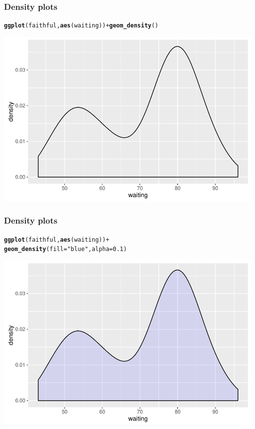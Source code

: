 \documentclass{beamer}\usepackage[]{graphicx}\usepackage[]{color}
\makeatletter
\newcommand{\hlnum}[1]{\textcolor[rgb]{0.686,0.059,0.569}{#1}}%
\newcommand{\hlstr}[1]{\textcolor[rgb]{0.192,0.494,0.8}{#1}}%
\newcommand{\hlopt}[1]{\textcolor[rgb]{0,0,0}{#1}}%
\newcommand{\hlstd}[1]{\textcolor[rgb]{0.345,0.345,0.345}{#1}}%
\newcommand{\hlkwc}[1]{\textcolor[rgb]{0.333,0.667,0.333}{#1}}%
\newcommand{\hlkwd}[1]{\textcolor[rgb]{0.737,0.353,0.396}{\textbf{#1}}}%
\newenvironment{kframe}{%
 \def\at@end@of@kframe{}%
 \ifinner\ifhmode%
  \def\at@end@of@kframe{\end{minipage}}%
  \begin{minipage}{\columnwidth}%
 \fi\fi%
 \def\FrameCommand##1{\hskip\@totalleftmargin \hskip-\fboxsep
 \colorbox{shadecolor}{##1}\hskip-\fboxsep
     \hskip-\linewidth \hskip-\@totalleftmargin \hskip\columnwidth}%
 \MakeFramed {\advance\hsize-\width
   \@totalleftmargin\z@ \linewidth\hsize
   \@setminipage}}%
 {\par\unskip\endMakeFramed%
 \at@end@of@kframe}
\newenvironment{knitrout}{}{} %
\makeatother
\begin{document}
\begin{frame}[fragile]
\frametitle{Density plots}
\begin{knitrout}\footnotesize
{}\color{fgcolor}\begin{kframe}
\begin{alltt}
\hlkwd{ggplot}\hlstd{(faithful,} \hlkwd{aes}\hlstd{(waiting))} \hlopt{+} \hlkwd{geom_density}\hlstd{()}
\end{alltt}
\end{kframe}

{\centering \includegraphics[width=.75\linewidth]{figure/densityone-1} 

}



\end{knitrout}
\end{frame}


\begin{frame}[fragile]
\frametitle{Density plots}
\begin{knitrout}\footnotesize
{}\color{fgcolor}\begin{kframe}
\begin{alltt}
\hlkwd{ggplot}\hlstd{(faithful,} \hlkwd{aes}\hlstd{(waiting))} \hlopt{+}
    \hlkwd{geom_density}\hlstd{(}\hlkwc{fill} \hlstd{=} \hlstr{"blue"}\hlstd{,} \hlkwc{alpha} \hlstd{=} \hlnum{0.1}\hlstd{)}
\end{alltt}
\end{kframe}

{\centering \includegraphics[width=.75\linewidth]{figure/densityonefove-1} 

}



\end{knitrout}
\end{frame}
\end{document}

